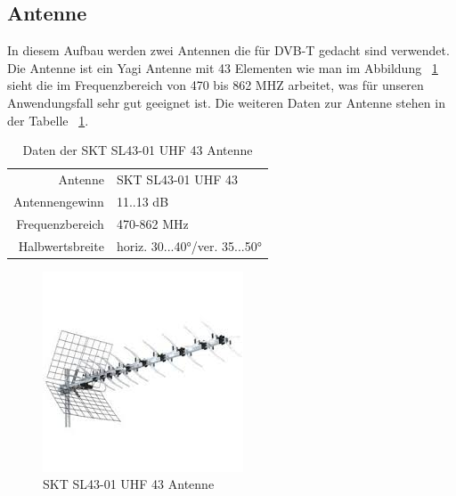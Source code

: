 \subsection{Antenne}
In diesem Aufbau werden zwei Antennen die für DVB-T gedacht sind verwendet. Die Antenne ist ein Yagi Antenne mit 43 Elementen wie man im Abbildung ~\ref{fig:antenne} sieht die im Frequenzbereich von 470 bis 862 MHZ arbeitet, was für unseren Anwendungsfall sehr gut geeignet ist. Die weiteren Daten zur Antenne stehen in der Tabelle ~\ref{table:antenne}.

\begin{table}
    \centering
        \begin{tabular}[h]{rl}
            Antenne         & SKT SL43-01 UHF 43            \\
            Antennengewinn  & 11..13 dB                     \\
            Frequenzbereich & 470-862 MHz                   \\
            Halbwertsbreite & horiz. 30...40°/ver. 35...50° \\
        \end{tabular}
    \caption{Daten der SKT SL43-01 UHF 43 Antenne}\label{table:antenne}
\end{table}

\begin{figure}
    \centering
    \includegraphics[width=\textwidth]{images/antenne.png}
    \caption{SKT SL43-01 UHF 43 Antenne}\label{fig:antenne}
\end{figure}
